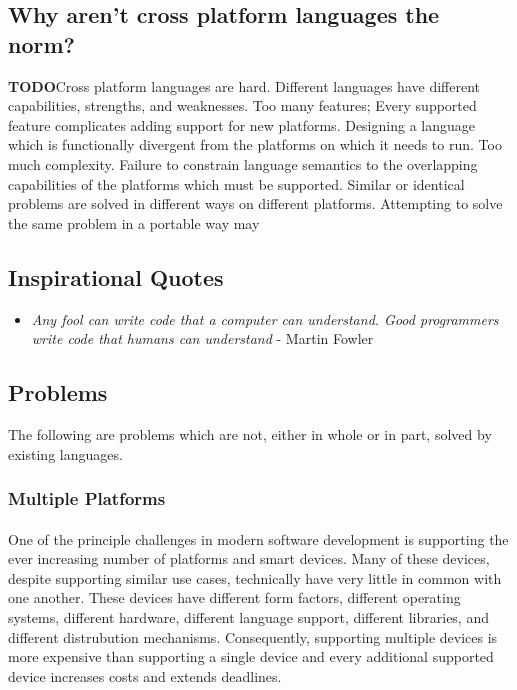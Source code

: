 \documentclass[hidelinks]{article}
\begin{document}
\subsection{Why aren't cross platform languages the norm?}
\textbf{TODO}Cross platform languages are hard. Different languages have different capabilities, strengths, and weaknesses. Too many features; Every supported feature complicates adding support for new platforms. Designing a language which is functionally divergent from the platforms on which it needs to run. Too much complexity. Failure to constrain language semantics to the overlapping capabilities of the platforms which must be supported. Similar or identical problems are solved in different ways on different platforms. Attempting to solve the same problem in a portable way may 
\subsection{Inspirational Quotes}
\begin{itemize}
\item \textit{Any fool can write code that a computer can understand. Good programmers write code that humans can understand} - Martin Fowler
\end{itemize}
\subsection{Problems}
The following are problems which are not, either in whole or in part, solved by existing languages.
\subsubsection{Multiple Platforms}\paragraph{}One of the principle challenges in modern software development is supporting the ever increasing number of platforms and smart devices. Many of these devices, despite supporting similar use cases, technically have very little in common with one another. These devices have different form factors, different operating systems, different hardware, different language support, different libraries, and different distrubution mechanisms. Consequently, supporting multiple devices is more expensive than supporting a single device and every additional supported device increases costs and extends deadlines.
\end{document}
